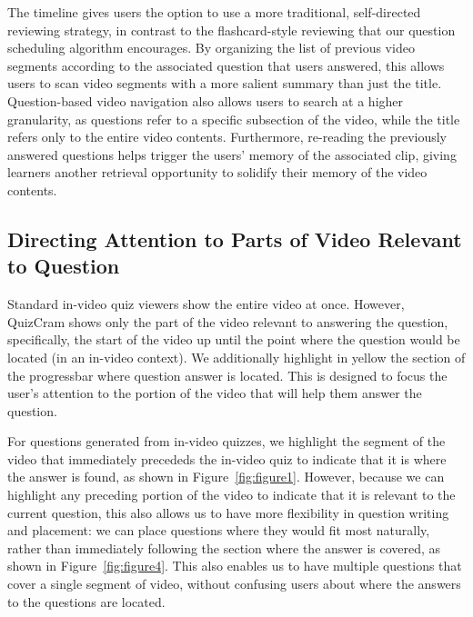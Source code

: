 \documentclass{sigchi}
\begin{document}
The timeline gives users the option to use a more traditional, self-directed reviewing strategy, in contrast to the flashcard-style reviewing that our question scheduling algorithm encourages. By organizing the list of previous video segments according to the associated question that users answered, this allows users to scan video segments with a more salient summary than just the title. Question-based video navigation also allows users to search at a higher granularity, as questions refer to a specific subsection of the video, while the title refers only to the entire video contents. Furthermore, re-reading the previously answered questions helps trigger the users' memory of the associated clip, giving learners another retrieval opportunity to solidify their memory of the video contents.

\subsection{Directing Attention to Parts of Video Relevant to Question}

Standard in-video quiz viewers show the entire video at once. However, QuizCram shows only the part of the video relevant to answering the question, specifically, the start of the video up until the point where the question would be located (in an in-video context). We additionally highlight in yellow the section of the progressbar where question answer is located. This is designed to focus the user's attention to the portion of the video that will help them answer the question.


For questions generated from in-video quizzes, we highlight the segment of the video that immediately precededs the in-video quiz to indicate that it is where the answer is found, as shown in Figure~\ref{fig:figure1}. However, because we can highlight any preceding portion of the video to indicate that it is relevant to the current question, this also allows us to have more flexibility in question writing and placement: we can place questions where they would fit most naturally, rather than immediately following the section where the answer is covered, as shown in Figure~\ref{fig:figure4}. This also enables us to have multiple questions that cover a single segment of video, without confusing users about where the answers to the questions are located.
\end{document}

